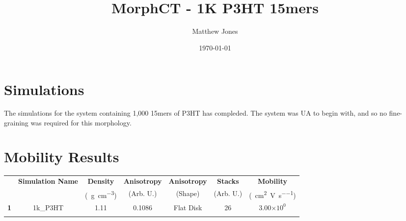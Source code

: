 \documentclass[12pt]{article}
\title{MorphCT - 1K P3HT 15mers}
\author{Matthew Jones}
\date{\today}
\def\mobunits{\square\centi\meter\per\volt\per\second}
\def\gcm{\gram\per\cubic\centi\meter}
\def\ccg{\cellcolor{gray}}
\begin{document}
\maketitle


\section{Simulations}


The simulations for the system containing 1,000 15mers of P3HT has compleded.
The system was UA to begin with, and so no fine-graining was required for this morphology.


\section{Mobility Results}


\begin{center}
\begin{tabular}{| c | c | c | c | c | c | c |}
\hline
\rule{0pt}{2.5ex} 
\multirow{2}{*}{\textbf{ID}}&\multirow{2}{*}{\textbf{Simulation Name}}&\textbf{Density}&\textbf{Anisotropy}&\textbf{Anisotropy}&\textbf{Stacks}&\textbf{Mobility}\\
                            &&(\SI{}{\gcm})&(Arb. U.)&(Shape)&(Arb. U.)&(\SI{}{\mobunits})\\
\hhline{|=======|}
\textbf{\ccg1}&\rule{0pt}{2.5ex}\ccg 1k\_P3HT&\ccg 1.11&\ccg 0.1086&\ccg Flat Disk&\ccg26&\ccg3.00$\times 10^{0}$\\
\hhline{-------}
\end{tabular}\label{table:mob}
\end{center}

\clearpage
\end{document}
